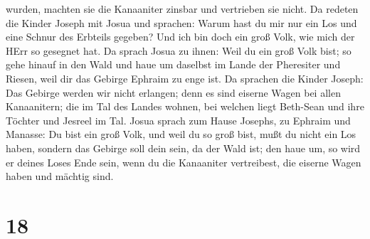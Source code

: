wurden, machten sie die Kanaaniter zinsbar und vertrieben sie nicht.
 Da redeten die Kinder Joseph mit Josua und sprachen: Warum
hast du mir nur ein Los und eine Schnur des Erbteils gegeben? Und ich
bin doch ein groß Volk, wie mich der HErr so gesegnet hat. 
Da sprach Josua zu ihnen: Weil du ein groß Volk bist; so gehe hinauf in
den Wald und haue um daselbst im Lande der Pheresiter und Riesen, weil
dir das Gebirge Ephraim zu enge ist.  Da sprachen die
Kinder Joseph: Das Gebirge werden wir nicht erlangen; denn es sind
eiserne Wagen bei allen Kanaanitern; die im Tal des Landes wohnen, bei
welchen liegt Beth-Sean und ihre Töchter und Jesreel im Tal.
 Josua sprach zum Hause Josephs, zu Ephraim und Manasse: Du
bist ein groß Volk, und weil du so groß bist, mußt du nicht ein Los
haben,  sondern das Gebirge soll dein sein, da der Wald
ist; den haue um, so wird er deines Loses Ende sein, wenn du die
Kanaaniter vertreibest, die eiserne Wagen haben und mächtig sind.

\hypertarget{section-17}{%
\section{18}\label{section-17}}

